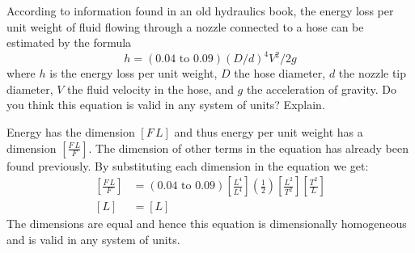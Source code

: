 \begin{question}
  According to information found in an old hydraulics book, the energy
  loss per unit weight of fluid flowing through a nozzle connected to
  a hose can be estimated by the formula
  \begin{equation*}
    h = (\num{0.04} \textrm{ to } \num{0.09})(D/d)^4V^2/2g
  \end{equation*}
  where $h$ is the energy loss per unit weight, $D$ the hose diameter,
  $d$ the nozzle tip diameter, $V$ the fluid velocity in the hose, and
  $g$ the acceleration of gravity. Do you think this equation is valid
  in any system of units? Explain.
\end{question}
\begin{solution}
  Energy has the dimension $[F\,L]$ and thus energy per unit weight
  has a dimension $[\frac{F\,L}{F}]$. The dimension of other terms in
  the equation has already been found previously. By substituting each
  dimension in the equation we get:
  \begin{align*}
    \left[\frac{F\,L}{F}\right] &=
    (\num{0.04}\textrm{ to } \num{0.09})\left[\frac{L^4}{L^4}\right](\frac{1}{2})
    \left[\frac{L^2}{T^2}\right]\left[\frac{T^2}{L}\right] \\
    [L] &= [L]
  \end{align*}
 The dimensions are equal and hence this equation is dimensionally
 homogeneous and is valid in any system of units.
\end{solution}

